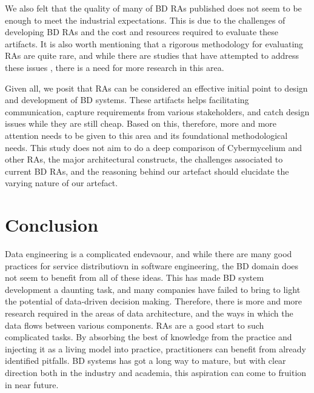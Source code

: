 \documentclass[review]{elsarticle}
\begin{document}
We also felt that the quality of many of BD RAs published does not seem to be enough to meet the industrial expectations. This is due to the challenges of developing BD RAs and the cost and resources required to evaluate these artifacts. It is also worth mentioning that a rigorous methodology for evaluating RAs are quite rare, and while there are studies that have attempted to address these issues \cite{angelov2008towards}, there is a need for more research in this area.

Given all, we posit that RAs can be considered an effective initial point to design and development of BD systems. These artifacts helps facilitating communication, capture requirements from various stakeholders, and catch design issues while they are still cheap. Based on this, therefore, more and more attention needs to be given to this area and its foundational methodological needs. This study does not aim to do a deep comparison of Cybermycelium and other RAs, the major architectural constructs, the challenges associated to current BD RAs, and the reasoning behind our artefact should elucidate the varying nature of our artefact.

\section{Conclusion} \label{conclusion-section}

Data engineering is a complicated endevaour, and while there are many good practices for service distributiovn in software engineering, the BD domain does not seem to benefit from all of these ideas. This has made BD system development a daunting task, and many companies have failed to bring to light the potential of data-driven decision making. Therefore, there is more and more research required in the areas of data architecture, and the ways in which the data flows between various components. RAs are a good start to such complicated tasks. By absorbing the best of knowledge from the practice and injecting it as a living model into practice, practitioners can benefit from already identified pitfalls. BD systems has got a long way to mature, but with clear direction both in the industry and academia, this aspiration can come to fruition in near future.





\appendix
\end{document}

